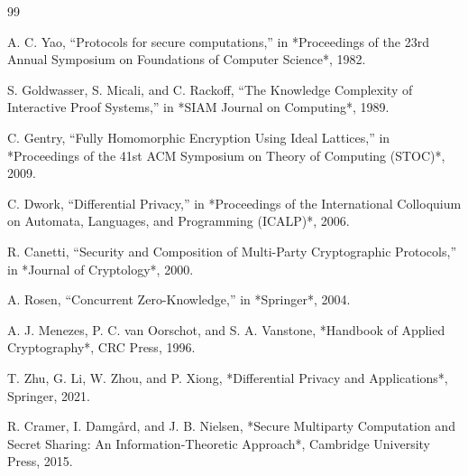 \documentclass[conference]{IEEEtran}
\begin{document}
\begin{thebibliography}{99}

A. C. Yao, ``Protocols for secure computations,'' in *Proceedings of the 23rd Annual Symposium on Foundations of Computer Science*, 1982.

S. Goldwasser, S. Micali, and C. Rackoff, ``The Knowledge Complexity of Interactive Proof Systems,'' in *SIAM Journal on Computing*, 1989.

C. Gentry, ``Fully Homomorphic Encryption Using Ideal Lattices,'' in *Proceedings of the 41st ACM Symposium on Theory of Computing (STOC)*, 2009.

C. Dwork, ``Differential Privacy,'' in *Proceedings of the International Colloquium on Automata, Languages, and Programming (ICALP)*, 2006.

R. Canetti, ``Security and Composition of Multi-Party Cryptographic Protocols,'' in *Journal of Cryptology*, 2000.

A. Rosen, ``Concurrent Zero-Knowledge,'' in *Springer*, 2004.

A. J. Menezes, P. C. van Oorschot, and S. A. Vanstone, *Handbook of Applied Cryptography*, CRC Press, 1996.

T. Zhu, G. Li, W. Zhou, and P. Xiong, *Differential Privacy and Applications*, Springer, 2021.

R. Cramer, I. Damgård, and J. B. Nielsen, *Secure Multiparty Computation and Secret Sharing: An Information-Theoretic Approach*, Cambridge University Press, 2015.

\end{thebibliography}



\end{document}
